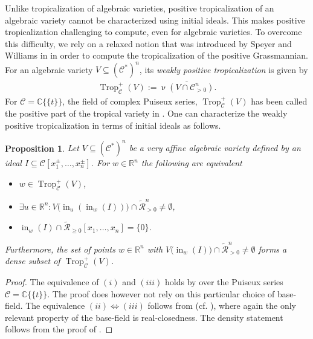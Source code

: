 \documentclass{article}
\newtheorem{proposition}[theorem]{Proposition}
\theoremstyle{definition}
\DeclareMathOperator{\val}{\nu}
\DeclareMathOperator{\initial}{in}
\DeclareMathOperator{\Trop}{Trop}
\newcommand{\CC}{\mathcal{C}}
\begin{document}
Unlike tropicalization of algebraic varieties, positive tropicalization of an algebraic variety cannot be characterized using initial ideals. This makes positive tropicalization challenging to compute, even for algebraic varieties.
To overcome this difficulty, we 
rely on a relaxed notion that was introduced by Speyer and Williams in \cite{SpeyerWilliams::PosGrassmannian}
in order to compute the  tropicalization of the positive Grassmannian.
 For an algebraic variety $V \subseteq (\CC^*)^n$, its \emph{weakly positive tropicalization} is given by
\begin{align}
    \label{Def:WeakPosTrop}
    \Trop^+_\CC(V) := \overline{ \val( V \cap \mathcal{C}_{>0}^n) }.
\end{align}
For $\CC=  \mathbb{C}\{\!\{t \}\!\}$, the field of complex Puiseux series, $\Trop^+_\CC(V) $ has been called the positive part of the tropical variety in \cite{SpeyerWilliams::PosGrassmannian}. One can characterize the weakly positive tropicalization in terms of initial ideals as follows.


\begin{proposition}
\label{Prop::CharWeakSigned}
Let  $V \subseteq (\CC^*)^n$ be a very affine algebraic variety defined by an ideal $I \subseteq \mathcal{C}[x_1^\pm, \dots , x_n^\pm]$. For $w \in \mathbb{R}^n$ the following are equivalent
\begin{itemize}
    \item[(i)] $ w \in \Trop_\CC^+(V)$,
    \item[(ii)] $\exists u \in \mathbb{R}^n \colon V\big( \initial_u(\initial_w(I)) \big) \cap \widetilde{\mathcal{R}}^{n}_{>0} \neq \emptyset$,
    \item[(iii)] $\initial_w(I) \cap \widetilde{\mathcal{R}}_{\geq 0}[x_1, \dots , x_n] = \{ 0 \} $.
\end{itemize}
 Furthermore, the set of points $w \in \mathbb{R}^n$ with $V\big( \initial_w(I) \big) \cap \widetilde{\mathcal{R}}^{n}_{>0} \neq \emptyset $ forms a dense subset of $\Trop_\CC^+(V)$.
\end{proposition}
\begin{proof}
    The equivalence of $(i)$ and $(iii)$ holds by \cite[Proposition 2.2]{SpeyerWilliams::PosGrassmannian} over the Puiseux series $\CC = \mathbb{C}\{\!\{t \}\!\}$. The proof does however not rely on this particular choice of base-field.
    The equivalence $(ii) \iff (iii)$ follows from \cite{EinsiedlerTuncal::IdealPosPoly} (cf. \cite[Proposition 2.9]{Vinzant::RealRadical}), where again the only relevant property of the base-field is real-closedness.
    The density statement follows from the proof of \cite[Proposition 2.2]{SpeyerWilliams::PosGrassmannian}.
\end{proof}
\end{document}
